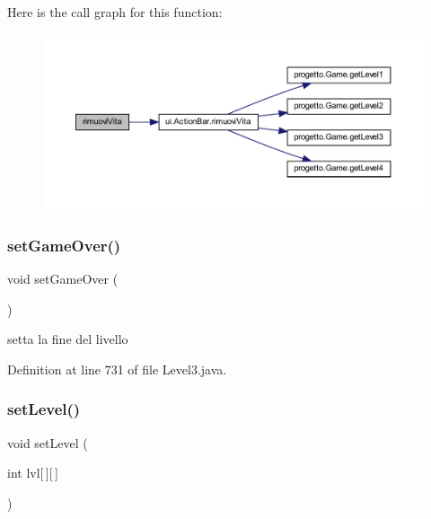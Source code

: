 Here is the call graph for this function\+:\nopagebreak
\begin{figure}[H]
\begin{center}
\leavevmode
\includegraphics[width=350pt]{classscenes_1_1_level3_a484775c889ccd8602b66ad795b141534_cgraph}
\end{center}
\end{figure}
\mbox{\label{classscenes_1_1_level3_a49e1d0816e9e0cabfb855147f399f5b5}} 
\subsubsection{\texorpdfstring{set\+Game\+Over()}{setGameOver()}}
{\footnotesize\ttfamily void set\+Game\+Over (\begin{DoxyParamCaption}{ }\end{DoxyParamCaption})}



setta la fine del livello 



Definition at line 731 of file Level3.\+java.

\mbox{\label{classscenes_1_1_level3_afdd7363804bf6696ce4a46d6448844ed}} 
\subsubsection{\texorpdfstring{set\+Level()}{setLevel()}}
{\footnotesize\ttfamily void set\+Level (\begin{DoxyParamCaption}\item[{int}]{lvl\mbox{[}$\,$\mbox{]}\mbox{[}$\,$\mbox{]} }\end{DoxyParamCaption})}




